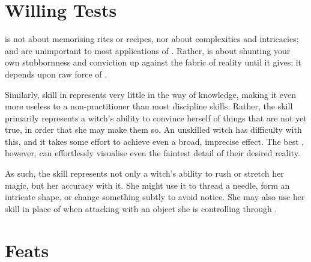 \section{Willing Tests}

 is not about memorising rites or recipes, nor about complexities and intricacies;  and  are unimportant to most applications of .
Rather,  is about shunting your own stubbornness and conviction up against the fabric of reality until it gives; it depends upon raw force of .

Similarly, skill in  represents very little in the way of knowledge, making it even more useless to a non-practitioner than most discipline skills.
Rather, the skill primarily represents a witch's ability to convince herself of things that are not yet true, in order that she may make them so.
An unskilled witch has difficulty with this, and it takes some effort to achieve even a broad, imprecise effect.
The best , however, can effortlessly visualise even the faintest detail of their desired reality.

As such, the  skill represents not only a witch's ability to rush or stretch her magic, but her accuracy with it.
She might use it to thread a needle, form an intricate shape, or change something subtly to avoid notice.
She may also use her  skill in place of  when attacking with an object she is controlling through .

\section{Feats}



